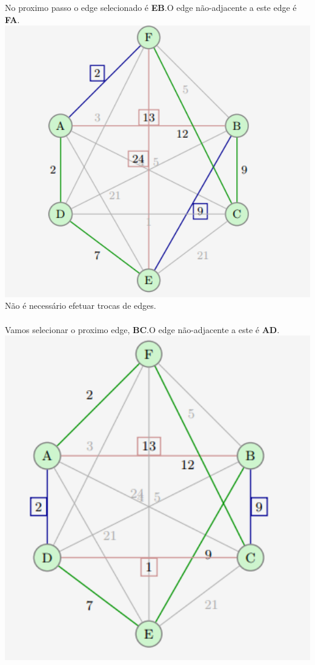 \documentclass[12pt,a4paper,portrait]{article}
\begin{document}
			\newpage
			No proximo passo o edge selecionado é \textbf{EB}.O edge não-adjacente a este edge é \textbf{FA}.\\
			\includegraphics[width=1.0\textwidth]{imagens/5}
			Não é necessário efetuar trocas de edges.\\\\
			\newpage
			Vamos selecionar o proximo edge, \textbf{BC}.O edge não-adjacente a este é \textbf{AD}.
			\includegraphics[width=1.0\textwidth]{imagens/6}
\end{document}
